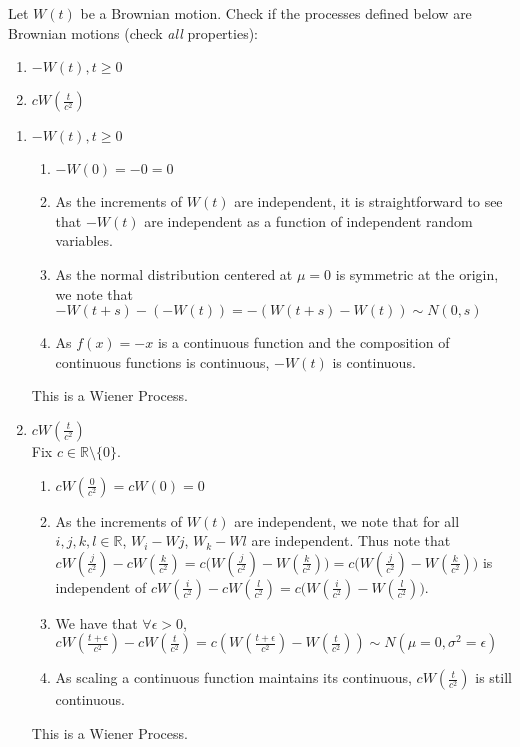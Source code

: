 \documentclass[12pt,twoside, letter]{exam}
\theoremstyle{definition}
\newcommand{\rr}{\mathbb{R}}
\begin{document}
 Let $W(t)$ be a Brownian motion. Check if the processes defined below are Brownian motions (check \textit{all} properties):

\begin{enumerate}
  \item $-W(t), t\geq0$
  \item $cW(\frac{t}{c^2})$
\end{enumerate}

\begin{solution}
  \begin{enumerate}
    \item $-W(t), t\geq0$
      \begin{enumerate}[label = (\roman*)]
        \item $-W(0) = -0 = 0$
        \item As the increments of $W(t)$ are independent, it is straightforward to see that $-W(t)$ are independent as a function of independent random variables.
        \item As the normal distribution centered at $\mu = 0$ is symmetric at the origin, we note that $-W(t+s) - (-W(t)) = -(W(t+s)-W(t)) \sim N(0, s)$
        \item As $f(x) = -x$ is a continuous function and the composition of continuous functions is continuous, $-W(t)$ is continuous.
      \end{enumerate}
    This is a Wiener Process.
    \item $cW(\frac{t}{c^2})$ \\
      Fix $c \in \rr \setminus \{0\}$.
      \begin{enumerate}[label = (\roman*)]
        \item $cW(\frac{0}{c^{2}}) = cW(0) = 0$
        \item As the increments of $W(t)$ are independent, we note that for all $i,j,k,l \in \rr$, $W_{i} - W{j}$, $W_{k} - W{l}$ are independent. Thus note that
          $cW(\frac{j}{c^2}) - cW(\frac{k}{c^2}) = c\big(W(\frac{j}{c^2}) - W(\frac{k}{c^2})\big) = c\big(W(\frac{j}{c^2}) - W(\frac{k}{c^2})\big)$ is independent of
          $cW(\frac{i}{c^2}) - cW(\frac{l}{c^2}) = c\big(W(\frac{i}{c^2}) - W(\frac{l}{c^2})\big)$.
        \item We have that $\forall \epsilon > 0$, $cW(\frac{t+\epsilon}{c^2}) - cW(\frac{t}{c^2}) = c(W(\frac{t+\epsilon}{c^2})-W(\frac{t}{c^2})) \sim N(\mu = 0, \sigma^{2} = \epsilon)$
        \item As scaling a continuous function maintains its continuous, $cW(\frac{t}{c^2})$ is still continuous.    
      \end{enumerate}
      This is a Wiener Process.
  \end{enumerate}
\end{solution}
\end{document}

